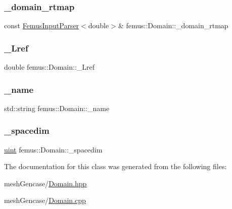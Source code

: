 \subsubsection{\texorpdfstring{\+\_\+domain\+\_\+rtmap}{\_domain\_rtmap}}
{\footnotesize\ttfamily const \mbox{\hyperlink{classfemus_1_1_femus_input_parser}{Femus\+Input\+Parser}}$<$double$>$\& femus\+::\+Domain\+::\+\_\+domain\+\_\+rtmap}

\mbox{\label{classfemus_1_1_domain_a62bbfa8103bf9cc181d09099cb3ad839}} 
\subsubsection{\texorpdfstring{\+\_\+\+Lref}{\_Lref}}
{\footnotesize\ttfamily double femus\+::\+Domain\+::\+\_\+\+Lref}

\mbox{\label{classfemus_1_1_domain_a7ed9fa5a4642690ceb7c849954b89c1f}} 
\subsubsection{\texorpdfstring{\+\_\+name}{\_name}}
{\footnotesize\ttfamily std\+::string femus\+::\+Domain\+::\+\_\+name}

\mbox{\label{classfemus_1_1_domain_a940e6bd8a80fba5be0da7871703f6166}} 
\subsubsection{\texorpdfstring{\+\_\+spacedim}{\_spacedim}}
{\footnotesize\ttfamily \mbox{\hyperlink{_typedefs_8hpp_a91ad9478d81a7aaf2593e8d9c3d06a14}{uint}} femus\+::\+Domain\+::\+\_\+spacedim}



The documentation for this class was generated from the following files\+:\begin{DoxyCompactItemize}
\item 
mesh\+Gencase/\mbox{\hyperlink{_domain_8hpp}{Domain.\+hpp}}\item 
mesh\+Gencase/\mbox{\hyperlink{_domain_8cpp}{Domain.\+cpp}}\end{DoxyCompactItemize}
